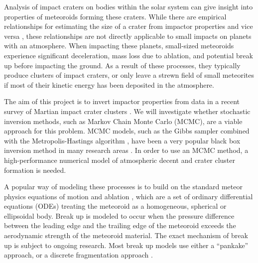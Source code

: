 Analysis of impact craters on bodies within the solar system can give insight into properties of meteoroids forming these craters.
While there are empirical relationships for estimating the size of a crater from impactor properties and vice versa \citep[e.g.][]{holsapple1987scaling}, these relationships are not directly applicable to small impacts on planets with an atmosphere.
When impacting these planets, small-sized meteoroids experience significant deceleration, mass loss due to ablation, and potential break up before impacting the ground.
As a result of these processes, they typically produce clusters of impact craters, or only leave a strewn field of small meteorites if most of their kinetic energy has been deposited in the atmosphere.

The aim of this project is to invert impactor properties from data in a recent survey of Martian impact crater clusters \citep{daubar2019recently}.
We will investigate whether stochastic inversion methods, such as Markov Chain Monte Carlo (MCMC), are a viable approach for this problem.
MCMC models, such as the Gibbs sampler combined with the Metropolis-Hastings algorithm \citep{gelfand1990sampling}, have been a very popular black box inversion method in many research areas \citep[in epidemiology e.g.][]{flaxman2020estimating}.
In order to use an MCMC method, a high-performance numerical model of atmospheric decent and crater cluster formation is needed.

A popular way of modeling these processes is to build on the standard meteor physics equations of motion and ablation \citep[e.g.][]{opik1958physics}, which are a set of ordinary differential equations (ODEs) treating the meteoroid as a homogeneous, spherical or ellipsoidal body.
Break up is modeled to occur when the pressure difference between the leading edge and the trailing edge of the meteoroid exceeds the aerodynamic strength of the meteoroid material.
The exact mechanism of break up is subject to ongoing research. Most break up models use either a ``pankake'' approach, or a discrete fragmentation approach \citep{register2017asteroid}.

